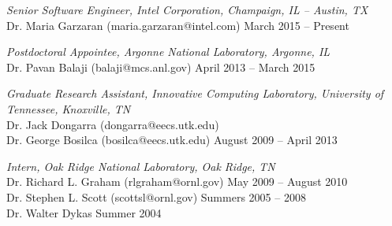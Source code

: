 {\sl Senior Software Engineer, Intel Corporation, Champaign, IL -- Austin, TX} \\
Dr. Maria Garzaran (maria.garzaran@intel.com) \hfill March 2015 -- Present

\vspace{0.1in}
{\sl Postdoctoral Appointee, Argonne National Laboratory, Argonne, IL} \\
Dr. Pavan Balaji (balaji@mcs.anl.gov) \hfill April 2013 -- March 2015

\vspace{0.1in}
{\sl Graduate Research Assistant, Innovative Computing Laboratory, University of Tennessee, Knoxville, TN} \\
Dr. Jack Dongarra (dongarra@eecs.utk.edu) \\
Dr. George Bosilca (bosilca@eecs.utk.edu) \hfill August 2009 -- April 2013

\vspace{0.1in}
{\sl Intern, Oak Ridge National Laboratory, Oak Ridge, TN} \\
Dr. Richard L. Graham (rlgraham@ornl.gov) \hfill May 2009 -- August 2010 \\
Dr. Stephen L. Scott (scottsl@ornl.gov) \hfill Summers 2005 -- 2008 \\
Dr. Walter Dykas \hfill Summer 2004

